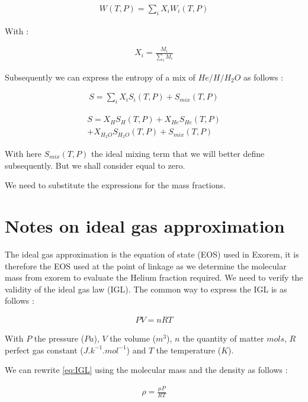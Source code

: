 \begin{align} 
    W(T,P) = \sum_{i} X_{i} W_{i}(T,P)
    \label{eq:extensive_qty}
\end{align}

With :

\begin{align} 
    X_{i} = \frac{M_i}{\sum_{i}M_{i}}
    \label{eq:mass_fraction}
\end{align}

Subsequently we can express the entropy of a mix of $He/H/H_2O$ as follows :

\begin{align} 
    S = \sum_{i} X_{i} S_{i}(T,P) + S_{mix}(T,P)
    \label{eq:entropy_mix1}
\end{align}

\begin{align} 
    S = X_{H} S_{H}(T,P) + X_{He} S_{He}(T,P) \nonumber \\ 
    + X_{H_2O} S_{H_2O}(T,P) + S_{mix}(T,P)
    \label{eq:entropy_mix2}
\end{align}

With here $S_{mix}(T,P)$ the ideal mixing term that we will better define subsequently. But we shall consider equal to zero.

We need to substitute the expressions for the mass fractions. 

\section{Notes on ideal gas approximation}
The ideal gas approximation is the equation of state (EOS) used in Exorem, it is therefore the EOS used at the point of linkage as we determine the molecular mass from exorem to evaluate the Helium fraction required.
We need to verify the validity of the ideal gas law (IGL).
The common way to express the IGL is as follows :

\begin{align} 
    PV = nRT \label{eq:IGL}
\end{align}

With $P$ the pressure ($Pa$), $V$ the volume ($m^3$), $n$ the quantity of matter $mols$, $R$ perfect gas constant ($J.k^{-1}.mol^{-1}$) and $T$ the temperature ($K$).

We can rewrite \cref{eq:IGL} using the molecular mass and the density as follows :

\begin{align} 
    \rho = \frac{\mu P}{RT} \label{eq:IGL2}
\end{align}

